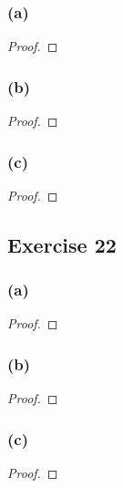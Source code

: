 \documentclass[14pt]{extarticle}
\begin{document}
\subsubsection{(a)}

\begin{proof}

\end{proof}

\subsubsection{(b)}

\begin{proof}

\end{proof}

\subsubsection{(c)}

\begin{proof}

\end{proof}

\subsection{Exercise 22}

\subsubsection{(a)}

\begin{proof}

\end{proof}

\subsubsection{(b)}

\begin{proof}

\end{proof}

\subsubsection{(c)}

\begin{proof}

\end{proof}
\end{document}
